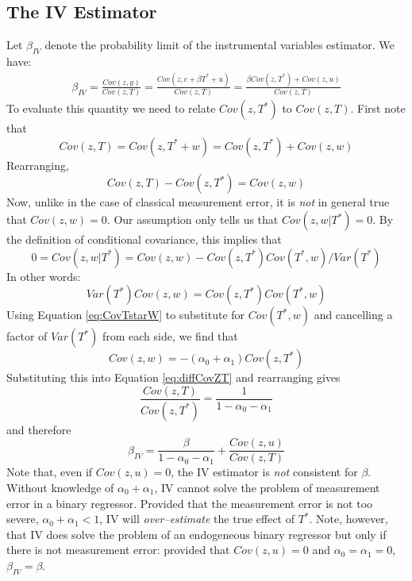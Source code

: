 \subsection{The IV Estimator}
Let $\beta_{IV}$ denote the probability limit of the instrumental variables estimator.
We have:
\begin{eqnarray*}
  \beta_{IV} =  \frac{Cov(z,y)}{Cov(z,T)} = \frac{Cov(z,c+\beta T^* + u)}{Cov(z,T)} =  \frac{\beta Cov(z,T^*) + Cov(z,u)}{Cov(z,T)}
\end{eqnarray*}
To evaluate this quantity we need to relate $Cov(z,T^*)$ to $Cov(z,T)$.
First note that
\begin{equation*}
  Cov(z,T) = Cov(z, T^*+w) = Cov(z,T^*) + Cov(z,w)
\end{equation*}
Rearranging,
\begin{equation}
  Cov(z,T) - Cov(z,T^*) = Cov(z,w)
  \label{eq:diffCovZT}
\end{equation}
Now, unlike in the case of classical measurement error, it is \emph{not} in general true that $Cov(z,w)=0$.
Our assumption only tells us that $Cov(z,w|T^*)=0$.
By the definition of conditional covariance, this implies that
\begin{equation*}
  0 = Cov(z,w|T^*) = Cov(z,w) - Cov(z,T^*)Cov(T^*,w)/Var(T^*)
\end{equation*}
In other words:
\begin{equation*}
  Var(T^*) Cov(z,w) = Cov(z,T^*)Cov(T^*,w)
\end{equation*}
Using Equation \ref{eq:CovTstarW} to substitute for $Cov(T^*,w)$ and cancelling a factor of $Var(T^*)$ from each side, we find that
\begin{equation}
  Cov(z,w) = -(\alpha_0 + \alpha_1) Cov(z,T^*)
  \label{eq:CovZW}
\end{equation}
Substituting this into Equation \ref{eq:diffCovZT} and rearranging gives
\begin{equation}
  \frac{Cov(z,T)}{Cov(z,T^*)} = \frac{1}{1-\alpha_0-\alpha_1}
  \label{eq:ratioCovTZ}
\end{equation}
and therefore
\begin{equation}
  \beta_{IV} =  \frac{\beta}{1 - \alpha_0 - \alpha_1} + \frac{Cov(z,u)}{Cov(z,T)}
  \label{eq:IVplim}
\end{equation}
Note that, even if $Cov(z,u) = 0$, the IV estimator is \emph{not} consistent for $\beta$.
Without knowledge of $\alpha_0 + \alpha_1$, IV cannot solve the problem of measurement error in a binary regressor. 
Provided that the measurement error is not too severe, $\alpha_0 + \alpha_1 < 1$, IV will \emph{over--estimate} the true effect of $T^*$.
Note, however, that IV does solve the problem of an endogeneous binary regressor but only if there is not measurement error: provided that $Cov(z,u)=0$ and $\alpha_0 = \alpha_1=0$, $\beta_{IV} = \beta$.

